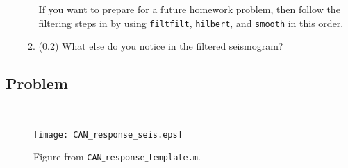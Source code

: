 \documentclass[11pt,titlepage,fleqn]{article}
\newcommand{\tfile}{{\tt lab$\_$response.m}}
\begin{document}
\begin{enumerate}
\begin{enumerate}
If you want to prepare for a future homework problem, then follow the filtering steps in \citet{Ni2005} by using \verb+filtfilt+, \verb+hilbert+, and \verb+smooth+ in this order.

\item (0.2) What else do you notice in the filtered seismogram?
\end{enumerate}

\end{enumerate}


\subsection*{Problem} \howmuchtime\

\pagebreak




%

\begin{figure}
\hspace{-1cm}
\texttt{[image: CAN\_response\_seis.eps]}
\caption[]
{{
Figure from {\tt CAN$\_$response$\_$template.m}.
}}
\label{fig:seis}
\end{figure}

\end{document}
